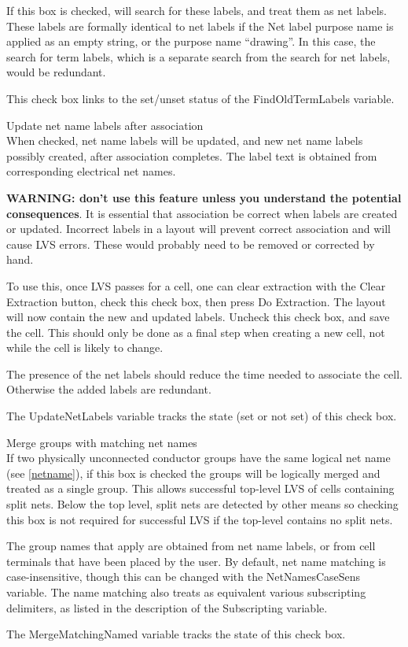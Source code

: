 \begin{description}
If this box is checked, {\Xic} will search for these labels, and treat
them as net labels.  These labels are formally identical to net labels
if the {\cb Net label purpose name} is applied as an empty string, or
the purpose name ``{\vt drawing}''.  In this case, the search for term
labels, which is a separate search from the search for net labels,
would be redundant.

This check box links to the set/unset status of the {\et
FindOldTermLabels} variable. 

\item{\cb Update net name labels after association}\\
When checked, net name labels will be updated, and new net name labels
possibly created, after association completes.  The label text is
obtained from corresponding electrical net names.

{\bf WARNING:  don't use this feature unless you understand the
potential consequences}.  It is essential that association be correct
when labels are created or updated.  Incorrect labels in a layout will
prevent correct association and will cause LVS errors.  These would
probably need to be removed or corrected by hand.

To use this, once LVS passes for a cell, one can clear extraction with
the {\cb Clear Extraction} button, check this check box, then press
{\cb Do Extraction}.  The layout will now contain the new and updated
labels.  Uncheck this check box, and save the cell.  This should only
be done as a final step when creating a new cell, not while the cell
is likely to change.

The presence of the net labels should reduce the time needed to
associate the cell.  Otherwise the added labels are redundant.

The {\et UpdateNetLabels} variable tracks the state (set or not set)
of this check box.

\item{\cb Merge groups with matching net names}\\
If two physically unconnected conductor groups have the same logical
net name (see \ref{netname}), if this box is checked the groups will
be logically merged and treated as a single group.  This allows
successful top-level LVS of cells containing split nets.  Below the
top level, split nets are detected by other means so checking this box
is not required for successful LVS if the top-level contains no split
nets.

The group names that apply are obtained from net name labels, or from
cell terminals that have been placed by the user.  By default, net
name matching is case-insensitive, though this can be changed with the
{\et NetNamesCaseSens} variable.  The name matching also treats as
equivalent various subscripting delimiters, as listed in the
description of the {\et Subscripting} variable.

The {\et MergeMatchingNamed} variable tracks the state of this check box.
\end{description}

